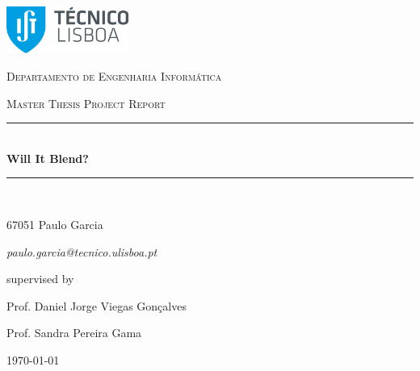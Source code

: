 \documentclass{report}
\newcommand{\HRule}{\rule{\linewidth}{0.5mm}} %
\begin{document}
\begin{titlepage}
	\centering
	\includegraphics[width=0.3\textwidth]{tecnico.png}\par\vspace{1cm}
	{\scshape\LARGE Departamento de Engenharia Informática \par}
	\vspace{1cm}
	{\scshape\Large Master Thesis Project Report\par}
	\vspace{1.5cm}
\HRule \\[0.4cm]
{ \huge \bfseries Will It Blend?}\\[0.4cm] %
\HRule \\[1.5cm]
	\vspace{2cm}
	{\Large 67051 Paulo Garcia\par
    \itshape paulo.garcia@tecnico.ulisboa.pt\par}
	\vfill
	supervised by\par
	Prof. Daniel Jorge Viegas Gonçalves \par
    Prof. Sandra Pereira Gama
	\vfill

	{\large \today\par}
\end{titlepage}

\clearpage
{}

    \tableofcontents
    \listoffigures

\begin{abstract}
Using color to convey information is not a recent rule: its usage is further associated to cartography, statistics and computer science. However, color is a subjective aspect of human perception, as it is strongly influenced by cultural background, childhood learning and possible existent color deficiencies. Over the last years, research has been made to ascertain if color is the ideal channel to transmit information; particularly, if the blending of two or more colors can reveal the true information lying within, using color blending techniques. \\
Nonetheless, previous investigation has not come to an agreement about to which extent can color blending techniques be used, in an efficient and effective way, to convey information. \\
Our goal is to study how color blending can be used to convey information in the best possible way creating, as product of this thesis, a set of rule-of-thumb guidelines to use color blending; we intend to study how color is influenced by its whereabouts, by the cultural background of each user, and if color perception is narrowed by the usage of nominal colors. \\
To achieve the aforementioned results of this thesis, we will not only create a Color Tuner which does not influence the color perception, but also a test framework which will be capable of handling multiple forms of study (\emph{i.e.} online, laboratory and crowdsourced).  
\end{abstract}
%
\setcounter{page}{1} 
\end{document}
